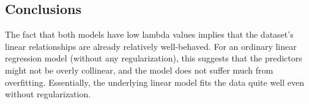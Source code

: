 \documentclass{article}
\begin{document}
\subsection{Conclusions}
The fact that both models have low lambda values implies that the dataset's linear relationships are already relatively well-behaved. For an ordinary linear regression model (without any regularization), this suggests that the predictors might not be overly collinear, and the model does not suffer much from overfitting. Essentially, the underlying linear model fits the data quite well even without regularization.
\end{document}
